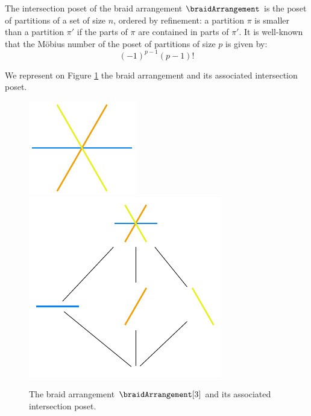 \begin{remark}
The intersection poset of the braid arrangement $\braidArrangement$ is the poset of partitions of a set of size $n$, ordered by refinement: a partition $\pi$ is smaller than a partition $\pi'$ if the parts of $\pi$ are contained in parts of $\pi'$. It is well-known \cite{Birkhoff, Rota} that the Möbius number of the poset of partitions of size $p$ is given by:
\begin{equation*}
(-1)^{p-1} (p-1)!
\end{equation*}

 
We represent on Figure \ref{fig:B3} the braid arrangement and its associated intersection poset.
\end{remark}

\begin{figure}
\centering
\includegraphics{figures/B3.pdf}
\includegraphics{figures/PosetB3.pdf}
\caption{The braid arrangement $\braidArrangement[3]$ and its associated intersection poset. \label{fig:B3}}
\end{figure}

